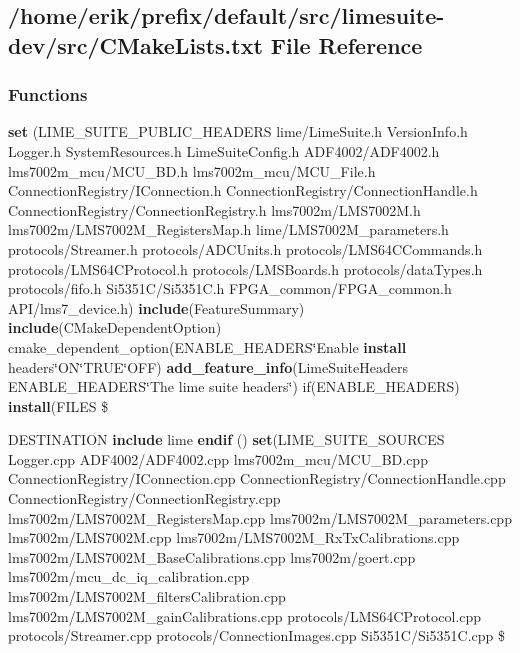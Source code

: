 \subsection{/home/erik/prefix/default/src/limesuite-\/dev/src/\+C\+Make\+Lists.txt File Reference}
\label{src_2CMakeLists_8txt}
\subsubsection*{Functions}
\begin{DoxyCompactItemize}
\item 
{\bf set} (L\+I\+M\+E\+\_\+\+S\+U\+I\+T\+E\+\_\+\+P\+U\+B\+L\+I\+C\+\_\+\+H\+E\+A\+D\+E\+RS lime/Lime\+Suite.\+h Version\+Info.\+h Logger.\+h System\+Resources.\+h Lime\+Suite\+Config.\+h A\+D\+F4002/A\+D\+F4002.\+h lms7002m\+\_\+mcu/M\+C\+U\+\_\+\+B\+D.\+h lms7002m\+\_\+mcu/M\+C\+U\+\_\+\+File.\+h Connection\+Registry/I\+Connection.\+h Connection\+Registry/Connection\+Handle.\+h Connection\+Registry/Connection\+Registry.\+h lms7002m/L\+M\+S7002\+M.\+h lms7002m/L\+M\+S7002\+M\+\_\+\+Registers\+Map.\+h lime/L\+M\+S7002\+M\+\_\+parameters.\+h protocols/Streamer.\+h protocols/A\+D\+C\+Units.\+h protocols/L\+M\+S64\+C\+Commands.\+h protocols/L\+M\+S64\+C\+Protocol.\+h protocols/L\+M\+S\+Boards.\+h protocols/data\+Types.\+h protocols/fifo.\+h Si5351C/Si5351\+C.\+h F\+P\+G\+A\+\_\+common/F\+P\+G\+A\+\_\+common.\+h A\+PI/lms7\+\_\+device.\+h) {\bf include}(Feature\+Summary) {\bf include}(C\+Make\+Dependent\+Option) cmake\+\_\+dependent\+\_\+option(E\+N\+A\+B\+L\+E\+\_\+\+H\+E\+A\+D\+E\+RS\char`\"{}Enable {\bf install} headers\char`\"{}ON\char`\"{}T\+R\+UE\char`\"{}O\+FF) {\bf add\+\_\+feature\+\_\+info}(Lime\+Suite\+Headers E\+N\+A\+B\+L\+E\+\_\+\+H\+E\+A\+D\+E\+RS\char`\"{}The lime suite headers\char`\"{}) if(E\+N\+A\+B\+L\+E\+\_\+\+H\+E\+A\+D\+E\+RS) {\bf install}(F\+I\+L\+ES \$
\item 
D\+E\+S\+T\+I\+N\+A\+T\+I\+ON {\bf include} lime {\bf endif} () {\bf set}(L\+I\+M\+E\+\_\+\+S\+U\+I\+T\+E\+\_\+\+S\+O\+U\+R\+C\+ES Logger.\+cpp A\+D\+F4002/A\+D\+F4002.\+cpp lms7002m\+\_\+mcu/M\+C\+U\+\_\+\+B\+D.\+cpp Connection\+Registry/I\+Connection.\+cpp Connection\+Registry/Connection\+Handle.\+cpp Connection\+Registry/Connection\+Registry.\+cpp lms7002m/L\+M\+S7002\+M\+\_\+\+Registers\+Map.\+cpp lms7002m/L\+M\+S7002\+M\+\_\+parameters.\+cpp lms7002m/L\+M\+S7002\+M.\+cpp lms7002m/L\+M\+S7002\+M\+\_\+\+Rx\+Tx\+Calibrations.\+cpp lms7002m/L\+M\+S7002\+M\+\_\+\+Base\+Calibrations.\+cpp lms7002m/goert.\+cpp lms7002m/mcu\+\_\+dc\+\_\+iq\+\_\+calibration.\+cpp lms7002m/L\+M\+S7002\+M\+\_\+filters\+Calibration.\+cpp lms7002m/L\+M\+S7002\+M\+\_\+gain\+Calibrations.\+cpp protocols/L\+M\+S64\+C\+Protocol.\+cpp protocols/Streamer.\+cpp protocols/Connection\+Images.\+cpp Si5351C/Si5351\+C.\+cpp \$

\end{DoxyCompactItemize}
